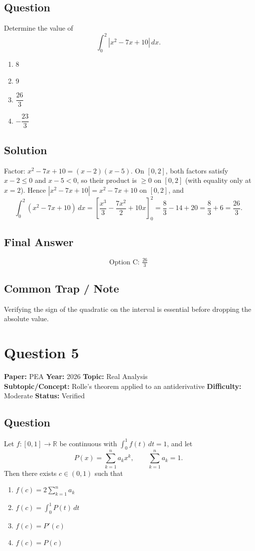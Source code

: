 \documentclass[11pt]{article}
\begin{document}
\subsection*{Question}
Determine the value of
\[
\int_0^2 |x^2 - 7x + 10|\,dx.
\]
\begin{enumerate}[label=(\Alph*)]
\item 8 \item 9 \item $\dfrac{26}{3}$ \item $-\dfrac{23}{3}$
\end{enumerate}

\subsection*{Solution}
Factor: $x^2 - 7x + 10 = (x-2)(x-5)$. On $[0,2]$, both factors satisfy
$x-2 \le 0$ and $x-5 < 0$, so their product is $\ge 0$ on $[0,2]$ (with equality
only at $x=2$). Hence $|x^2 - 7x + 10| = x^2 - 7x + 10$ on $[0,2]$, and
\[
\int_0^2 (x^2 - 7x + 10)\,dx
= \left[\frac{x^3}{3} - \frac{7x^2}{2} + 10x\right]_0^2
= \frac{8}{3} - 14 + 20 = \frac{8}{3} + 6 = \frac{26}{3}.
\]

\subsection*{Final Answer}
\[
\boxed{\text{Option C: } \tfrac{26}{3}}
\]

\subsection*{Common Trap / Note}
Verifying the sign of the quadratic on the interval is essential before dropping the absolute value.

\section*{Question 5}
\textbf{Paper:} PEA \quad \textbf{Year:} 2026 \quad \textbf{Topic:} Real Analysis \\
\textbf{Subtopic/Concept:} Rolle's theorem applied to an antiderivative \quad
\textbf{Difficulty:} Moderate \quad \textbf{Status:} Verified

\subsection*{Question}
Let $f:[0,1]\to\mathbb{R}$ be continuous with $\displaystyle\int_0^1 f(t)\,dt = 1$, and let
\[
P(x) = \sum_{k=1}^n a_k x^k, \qquad \sum_{k=1}^n a_k = 1.
\]
Then there exists $c \in (0,1)$ such that
\begin{enumerate}[label=(\Alph*)]
\item $f(c) = 2\sum_{k=1}^n a_k$
\item $f(c) = \int_0^1 P(t)\,dt$
\item $f(c) = P'(c)$
\item $f(c) = P(c)$
\end{enumerate}
\end{document}

